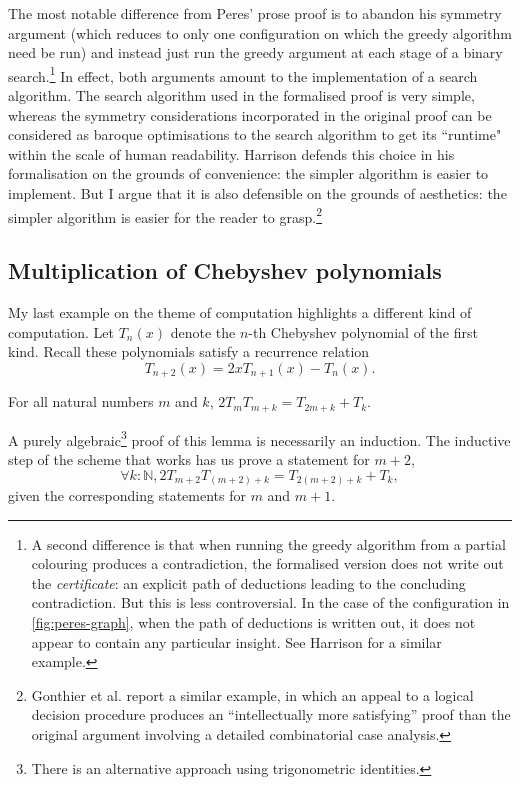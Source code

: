 \documentclass[12pt]{llncs}
\begin{document}
The most notable difference from Peres' prose proof
is to abandon his
symmetry argument (which reduces to only one configuration
on which the greedy algorithm need be run)
and instead just run the greedy argument at each stage of a binary search.\footnote{
A second difference is that when running the greedy algorithm from a partial colouring produces a contradiction,
the formalised version does not write out the \emph{certificate}:
an explicit path of deductions leading to the concluding contradiction.
But this is less controversial.
In the case of the configuration in \cref{fig:peres-graph},
when the path of deductions is written out,
it does not appear to contain any particular insight.
See Harrison \cite[section 3.4]{Har96} for a similar example.}
In effect, both arguments amount to the implementation of a search algorithm.
The search algorithm used in the formalised proof is very simple,
whereas the symmetry considerations incorporated in the original proof
can be considered as baroque optimisations to the search algorithm
to get its ``runtime" within the scale of human readability.
Harrison \cite[section 3]{Har09} defends this choice in his formalisation on the grounds of convenience:
the simpler algorithm is easier to implement.
But I argue that it is also defensible on the grounds of aesthetics:
the simpler algorithm is easier for the reader to grasp.\footnote{
Gonthier et al. \cite[section 4.3]{Gon13} report a similar example,
in which an appeal to a logical decision procedure
produces an ``intellectually more satisfying'' proof
than the original argument involving a detailed combinatorial case analysis.}

\subsection{Multiplication of Chebyshev polynomials}

My last example on the theme of computation highlights a different kind of computation.
Let $T_n(x)$ denote the $n$-th Chebyshev polynomial of the first kind.  Recall these polynomials
  satisfy a recurrence relation
  \[
    T_{n+2}(x)=2xT_{n+1}(x)-T_n(x).
  \]

\begin{lemma}
  For all natural numbers $m$ and $k$, $2T_mT_{m+k}=T_{2m+k}+T_k$.
\end{lemma}

A purely algebraic\footnote{There is an alternative approach using trigonometric identities.}
proof of this lemma is necessarily an induction.
The 
inductive step of the
scheme that works has us prove a statement for $m+2$,
\[
  \forall k :\mathbb{N}, 2T_{m+2}T_{(m+2)+k}=T_{2(m+2)+k}+T_{k},
\]
given the corresponding statements for $m$ and $m+1$.
\end{document}
